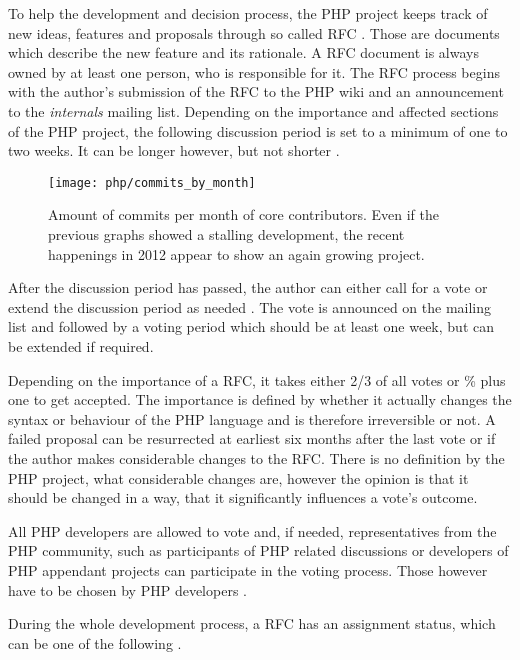 To help the development and decision process, the PHP project keeps track of
new ideas, features and proposals through so called \ac{RFC} \cite{PHPRFC}.
Those are documents which describe the new feature and its rationale. A
\ac{RFC} document is always owned by at least one person, who is responsible
for it. The \ac{RFC} process begins with the author's submission of the
\ac{RFC} to the PHP wiki and an announcement to the \emph{internals} mailing
list. Depending on the importance and affected sections of the PHP project, the
following discussion period is set to a minimum of one to two weeks. It can be
longer however, but not shorter \cite{PHPVoting}.

\begin{figure}[thbp]
  \centering
  \texttt{[image: php/commits\_by\_month]}
  \caption[Commits by Month, PHP]
  {Amount of commits per month of core contributors. Even if the previous
    graphs showed a stalling development, the recent happenings in 2012 appear
    to show an again growing project.}
  \label{fig:php:cbm}
\end{figure}

After the discussion period has passed, the author can either call for a vote
or extend the discussion period as needed \cite{PHPVoting}. The vote is
announced on the mailing list and followed by a voting period which should be
at least one week, but can be extended if required.

Depending on the importance of a \ac{RFC}, it takes either 2/3 of all votes or
\unit[50]{\%} plus one to get accepted. The importance is defined by whether it
actually changes the syntax or behaviour of the PHP language and is therefore
irreversible or not. A failed proposal can be resurrected at earliest six
months after the last vote or if the author makes considerable changes to the
\ac{RFC}. There is no definition by the PHP project, what considerable changes
are, however the opinion is that it should be changed in a way, that it
significantly influences a vote's outcome.

All PHP developers are allowed to vote and, if needed, representatives from the
PHP community, such as participants of PHP related discussions or developers of
PHP appendant projects can participate in the voting process. Those however
have to be chosen by PHP developers \cite{PHPWhoVote}.

During the whole development process, a \ac{RFC} has an assignment status,
which can be one of the following \cite{PHPRFC}.

